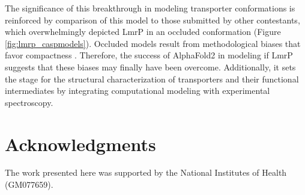 The significance of this breakthrough in modeling transporter conformations is reinforced by comparison of this model to those submitted by other contestants, which overwhelmingly depicted LmrP in an occluded conformation (Figure \ref{fig:lmrp_caspmodels}). Occluded models result from methodological biases that favor compactness \citep*{Nicoludis2018}. Therefore, the success of AlphaFold2 in modeling \gls{if} LmrP suggests that these biases may finally have been overcome. Additionally, it sets the stage for the structural characterization of transporters and their functional intermediates by integrating computational modeling with experimental spectroscopy.

\section{Acknowledgments}

The work presented here was supported by the National Institutes of Health (GM077659).